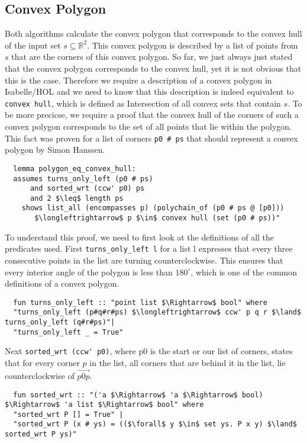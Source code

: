 \subsection{Convex Polygon}
\label{sec:conv_poly}
Both algorithms calculate the convex polygon that corresponds to the 
convex hull of the input set $s \subseteq \mathbb{R}^2$. This convex polygon 
is described by a list of points from $s$ that are the corners of this convex polygon.
So far, we just always just stated that the convex polygon corresponds to the 
convex hull, yet it is not obvious that this is the case. Therefore we require a  
description of a convex polygon in Isabelle/HOL and we need 
to know that this description is indeed equivalent to \lstinline|convex hull|, which is defined 
as Intersection of all convex sets that contain $s$. 
To be more precicse, we require a proof that the convex hull of the corners of such a 
convex polygon corresponds to the set of all points that lie within the polygon.
This fact was proven for a list of corners \lstinline|p0 # ps| that should
represent a convex polygon by Simon Hanssen.
\begin{lstlisting}
  lemma polygon_eq_convex_hull:
  assumes turns_only_left (p0 # ps)
      and sorted_wrt (ccw' p0) ps
      and 2 $\leq$ length ps
    shows list_all (encompasses p) (polychain_of (p0 # ps @ [p0]))
       $\longleftrightarrow$ p $\in$ convex hull (set (p0 # ps))"
\end{lstlisting}
To understand this proof, we need to first look at the definitions of all the predicates
used. First \lstinline|turns_only_left l| for a list l expresses that every three consecutive
points in the list are turning counterclockwise. This ensures that every interior angle of 
the polygon is less than $180^\circ$, which is one of the common definitions
of a convex polygon.
\begin{lstlisting}
  fun turns_only_left :: "point list $\Rightarrow$ bool" where
  "turns_only_left (p#q#r#ps) $\longleftrightarrow$ ccw' p q r $\land$ turns_only_left (q#r#ps)"|
  "turns_only_left _ = True"
\end{lstlisting}
Next \lstinline|sorted_wrt (ccw' p0)|, where p0 is the start or our list of corners, states that
for every corner $p$ in the list, all corners that are behind it in the list, lie counterclockwise
of $\overrightarrow{p0  p}$. 
\begin{lstlisting}
  fun sorted_wrt :: "('a $\Rightarrow$ 'a $\Rightarrow$ bool) $\Rightarrow$ 'a list $\Rightarrow$ bool" where
  "sorted_wrt P [] = True" |
  "sorted_wrt P (x # ys) = (($\forall$ y $\in$ set ys. P x y) $\land$ sorted_wrt P ys)"
\end{lstlisting}     
